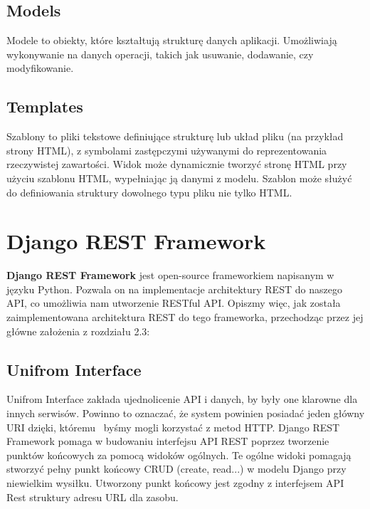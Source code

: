 \documentclass[oneside,polski,logo,indent]{amuthesis}
\begin{document}
\begin{center}
\subsection{Models}
\end{center}
Modele to obiekty, które kształtują strukturę danych aplikacji. Umożliwiają wykonywanie na danych operacji, takich jak usuwanie, dodawanie, czy modyfikowanie. 


\begin{center}
\subsection{Templates}
\end{center}
Szablony to pliki tekstowe definiujące strukturę lub układ pliku (na przykład strony HTML), z symbolami zastępczymi używanymi do reprezentowania rzeczywistej zawartości. Widok może dynamicznie tworzyć stronę HTML przy użyciu szablonu HTML, wypełniając ją danymi z modelu. Szablon może służyć do definiowania struktury dowolnego typu pliku nie tylko HTML.

\section{Django REST Framework}
\textbf{Django REST Framework} jest open-source frameworkiem napisanym w języku Python. Pozwala on na implementacje architektury REST do naszego API, co umożliwia nam utworzenie RESTful API. Opiszmy więc, jak została zaimplementowana architektura REST do tego frameworka, przechodząc przez jej główne założenia z rozdziału 2.3:

\begin{center}
\subsection{Unifrom Interface}
\end{center}
Unifrom Interface zakłada ujednolicenie API i danych, by były one klarowne dla innych serwisów. Powinno to oznaczać, że system powinien posiadać jeden główny URI dzięki, któremu~ byśmy mogli korzystać z metod HTTP. Django REST Framework pomaga w budowaniu interfejsu API REST poprzez tworzenie punktów końcowych za pomocą widoków ogólnych. Te ogólne widoki pomagają stworzyć pełny punkt końcowy CRUD (create, read...) w modelu Django przy niewielkim wysiłku. Utworzony punkt końcowy jest zgodny z interfejsem API Rest struktury adresu URL dla zasobu. 
\end{document}
